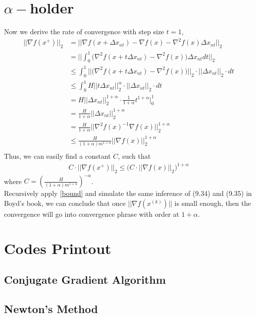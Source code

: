 \documentclass[11pt,a4paper]{article}
\begin{document}
\section{$\alpha-$holder}
\newcommand{\dx}{\Delta x_{nt}}
Now we derive the rate of convergence with step size $t = 1$,
\begin{align}
    || \nabla f(x^+) ||_2 
    & = || \nabla f(x + \dx) - \nabla f(x) - \nabla^2 f(x) \dx ||_2 \\
    & = \bigg|\bigg| \int_0^1 \big( \nabla^2 f(x + t\dx) - \nabla^2 f(x) \big) \dx dt \bigg|\bigg|_2 \\
    & \leq  \int_0^1 || \big( \nabla^2 f(x + t\dx) - \nabla^2 f(x) \big) ||_2 \cdot ||\dx||_2 \cdot dt  \\
    & \leq  \int_0^1 H ||t\dx||_2^\alpha \cdot ||\dx||_2 \cdot dt  \\
    & = H || \dx ||_2^{1+\alpha} \cdot \frac{1}{1+\alpha} t^{1+\alpha} \Bigg|_0^1 \\
    & = \frac{H}{1+\alpha} || \dx ||_2^{1+\alpha} \\
    & = \frac{H}{1+\alpha} || \nabla^2 f(x)^{-1} \nabla f(x) ||_2^{1+\alpha} \\
    & \leq \frac{H}{(1+\alpha) m^{1+\alpha}} ||\nabla f(x) ||_2^{1+\alpha} \\
\end{align}
Thus, we can easily find a constant $C$, such that
\begin{align}
    C  \cdot || \nabla f(x^+) ||_2 \leq
    \bigg(C \cdot ||\nabla f(x) ||_2 \bigg) ^{1+\alpha}  \label{bound}
\end{align}
where $C = (\frac{H}{(1+\alpha) m^{1+\alpha}})^{-\alpha}$. \\
Recursively apply \eqref{bound} and simulate the same inference of (9.34) and
(9.35) in Boyd's book, we can conclude that once $|| \nabla f(x^{(k)}) || $ is
small enough, then the convergence will go into convergence phrase with order
at $1+\alpha$.

\newpage
\appendix
\section{Codes Printout}

\subsection{Conjugate Gradient Algorithm}


\newpage
\subsection{Newton’s Method}

\end{document}
